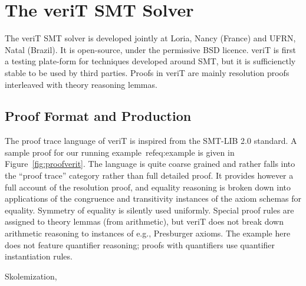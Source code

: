 \documentclass{llncs}
\begin{document}
\section{The veriT SMT Solver}
\label{sec:veriT}

The veriT SMT solver is developed jointly at Loria, Nancy (France) and UFRN,
Natal (Brazil).  It is open-source, under the permissive BSD licence.  veriT is
first a testing plate-form for techniques developed around SMT, but it is
sufficienctly stable to be used by third parties.  Proofs in veriT are mainly
resolution proofs interleaved with theory reasoning lemmas.

\subsection{Proof Format and Production}

The proof trace language of veriT is inspired from the SMT-LIB 2.0 standard.  A
sample proof for our running example~ref{eq:example} is given in
Figure~\ref{fig:proofverit}.  The language is quite coarse grained and rather
falls into the ``proof trace'' category rather than full detailed proof.  It
provides however a full account of the resolution proof, and equality reasoning
is broken down into applications of the congruence and transitivity instances of
the axiom schemas for equality.  Symmetry of equality is silently used
uniformly.  Special proof rules are assigned to theory lemmas (from arithmetic),
but veriT does not break down arithmetic reasoning to instances of
e.g., Presburger axioms.  The example here does not feature quantifier
reasoning; proofs with quantifiers use quantifier instantiation rules.

Skolemization, 
\end{document}
